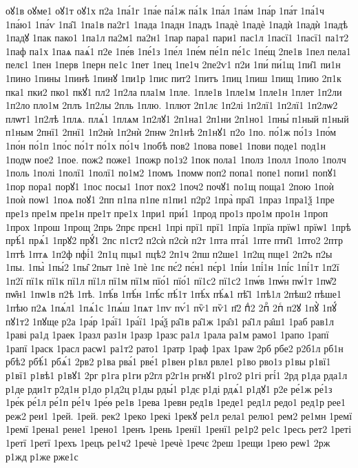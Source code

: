 {оꙋ1в
оꙋме1
оꙋ1т
оꙋ1х
п2а
1па́1г
1па́е
па́1ж
па́1к
1па́л
1па́м
1па́р
1па́т
1па́1ч
1па́ю1
1па́ѵ
1па̑1
1па1в
па2г1
1пада
1падн
1падъ
1падѐ
1падѐ
1падѝ
1падѝ
1падѣ
1падꙋ
1пак
пако1
1па1л
па2м1
па2н1
1пар
пара1
пари1
пас1л
1пасї1
1пасї1
па1т2
1паф
па1х
1паѧ
паѧ́1
п2е
1пе́в
1пе́1з
1пе́л
1пе́м
пе́1п
пе́1с
1пе́щ
2пе1в
1пел
пела1
пелє1
1пен
1перв
1перн
пе1с
1пет
1пец
1пе1ч
2пе2ѵ1
п2и
1пи́
пи́1щ
1пи̑1
пи1н
1пино
1пины
1пинѣ
1пинꙋ
1пи1р
1пис
пит2
1питъ
1пиц
1пиш
1пищ
1пию
2п1к
пка1
пки2
пко1
пкꙋ1
пл2
1п2ла
пла1м
1пле.
1пле1в
1пле1м
1пле1н
1плет
1п2ли
1п2ло
пло1м
2плъ
1п2лы
2пль
1плю.
1плют
2п1лє
1п2лі
1п2лї1
1п2лї1
1п2лѡ2
плѡт1
1п2лѣ
1плѧ.
плѧ́1
1плѧм
1п2лꙋ1
2п1на1
2п1ни
2п1но1
1пны́
п1ный
п1ный
п1ным
2пнї1
2пнї1
1п2нѝ
1п2нѝ
2пнѡ
2п1нѣ
2п1нꙋ1
п2о
1по.
по́1ж
по́1з
1по́м
1по́н
по́1п
1по́с
по́1т
по́1х
по́1ч
1побѣ
пов2
1пова
пове1
1пови
поде1
под1н
1подѡ
пое2
1пое.
пож2
поже1
1пожр
по1з2
1пок
пола1
1полз
1полл
1поло
1полч
1поль
1полі
1полї1
1полї1
по1м2
1помъ
1помѡ
поп2
попа1
попе1
попи1
попꙋ1
1пор
пора1
порꙋ1
1пос
посы1
1пот
пох2
1поч2
почꙋ1
по1щ
поща1
2пою
1поѝ
1поѝ
поѡ1
1поѧ
поꙋ1
2пп
п1па
п1пе
п1пи1
п2р2
1пра̀
пра̑1
1праз
1пра1ѯ
1пре
пре1з
пре1м
пре1н
пре1т
пре1х
1при1
при́1
1прод
про1з
про1м
про1н
1проп
1прох
1прош
1прощ
2прь
2прє
прєн1
1прі
прї1
прї1
1прїа
1прїа
прїѡ1
прїѡ1
1прѣ
прѣ́1
прѧ́1
1прꙋ2
прꙋ́1
2пс
п1ст2
п2сѝ
п2сѝ
п2т
1пта
пта́1
1пте
пти̑1
1пто2
2птр
1птѣ
1птѧ
1п2ф
пфі́1
2п1ц
пцы1
пцѣ2
2п1ч
2пш
п2ше1
1п2щ
пще1
2п2ъ
п2ы
1пы.
1пы̀
1пы́2
1пы̑
2пыт
1пѐ
1пѐ
1пє
пє́2
пє́н1
пє́р1
1пі́и
1пі́1н
1пі́с
1пі́1т
1п2ї
1п2ї
пї1к
пї1к
пї1л
пї1л
пї1м
пї1м
пїо́1
пїо́1
пї1с2
пї1с2
1пѡ́в
1пѡ́н
пѡ́1т
1пѡ̑2
пѡ̑н1
1пѡ1в
п2ѣ
1пѣ.
1пѣ́в
1пѣ́н
1пѣ́с
пѣ́1т
1пѣ́х
пѣ́ѧ1
пѣ̑1
1пѣ1л
2пѣш2
пѣше1
1пѣю
п2ѧ
1пѧ́л1
1пѧ́1с
1пѧ́ш
1пѧт
1пѵ
пѵ́1
пѷ1
пѷ1
п҃2
пⷣ2
2пⷬ
2пⷭ
п2ꙋ
1пꙋ̀
1пꙋ́
пꙋ1т2
1пꙋще
р2а
1ра́р
1ра́ї1
1ра́ї1
1ра́ѯ
ра̑1в
ра̑1ж
1ра̑з1
ра̑1л
ра̑ш1
1раб
рав1л
1раві
ра1д
1раек
1разл
раз1н
1разр
1разс
ра1л
1рала
ра1м
рамо1
1рапо
1рапї
1рапї
1раск
1расл
расѡ1
ра1т2
рато1
1ратр
1раф
1рах
1раѡ
2рб
рбе2
р2б1л
рб1н
рбѣ2
рбѣ́1
рбѧ́1
2рв2
р1ва
рва́1
рве́1
р1вен
р1вл
рвле1
р1во
рво1з
р1вы
р1вї1
р1вї1
р1вѣ1
р1вꙋ1
2рг
р1га
р1ги
р2гл
р2г1н
ргнꙋ1
р1го2
р1гі
ргі́1
2рд
р1да
рда1л
р1де
рди1т
р2д1н
р1до
р1д2ц
р1ды
рды́1
р1дє
р1ді
рдѧ́1
р1дꙋ1
р2е
ре́1ж
ре́1з
1ре́к
ре́1л
ре́1п
ре́1ч
1ре́ѳ
ре1в
1рева
1ревн
ред1в
1реде1
ред1л
редо1
ред1р
рее1
реж2
реи1
1рей.
1рей.
рек2
1реко
1рекі
1рекꙋ
ре1л
рела1
релю1
рем2
ре1мн
1ремї
1ремї
1рена1
рене1
1рено1
1ренъ
1рень
1ренї1
1ренї1
ре1р2
ре1с
1ресь
рет2
1реті
1ретї
1ретї
1рехъ
1рецъ
ре1ч2
1речѐ
1речѐ
1речє
2реш
1рещи
1рею
реѡ1
2рж
р1жд
р1же
рже1с
}
